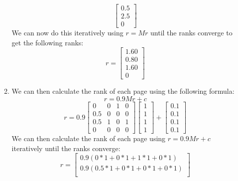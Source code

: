 \documentclass{article}
\begin{document}
\begin{enumerate}[label=(\alph*)]
\begin{enumerate}[label=(\roman*)]
\begin{equation*}
\begin{bmatrix}
            0.5 \\
            2.5 \\
            0
        \end{bmatrix}
    \end{equation*}
    We can now do this iteratively using $r = Mr$ until the ranks converge to get the following ranks:
    \begin{equation*}
        r = \begin{bmatrix}
            1.60 \\
            0.80 \\
            1.60 \\
            0
        \end{bmatrix}
    \end{equation*}
    \item We can then calculate the rank of each page using the following formula:
    \begin{equation*}
        r = 0.9Mr + c
    \end{equation*}
    \begin{equation*}
        r = 0.9
        \begin{bmatrix}
            0       & 0 & 1     & 0 \\
            0.5     & 0 & 0     & 0 \\
            0.5     & 1 & 0     & 1 \\
            0       & 0 & 0     & 0
        \end{bmatrix}
        \begin{bmatrix}
            1 \\
            1 \\
            1 \\
            1
        \end{bmatrix}
        + \begin{bmatrix}
            0.1 \\
            0.1 \\
            0.1 \\
            0.1
        \end{bmatrix}
    \end{equation*}
    We can then calculate the rank of each page using $r = 0.9Mr + c$ iteratively until the ranks converge:
    \begin{equation*}
        r = \begin{bmatrix}
            0.9(0*1 + 0*1 + 1*1 + 0*1)\\
            0.9(0.5*1 + 0*1 + 0*1 + 0*1)\\

\end{bmatrix}
\end{equation*}
\end{enumerate}
\end{enumerate}
\end{document}
